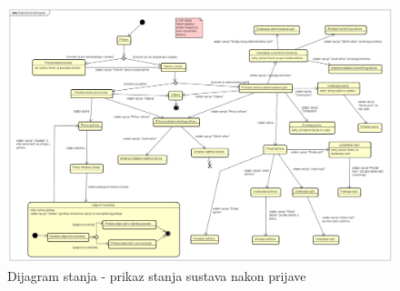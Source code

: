 			
			
			
			\begin{figure}[H]
				\includegraphics[width=\textwidth]{slike/StatemachineDiagram.PNG}
				\caption{Dijagram stanja - prikaz stanja sustava nakon prijave}
				\label{fig:statemachineDiagram}
			\end{figure}
			
			\newpage
			
